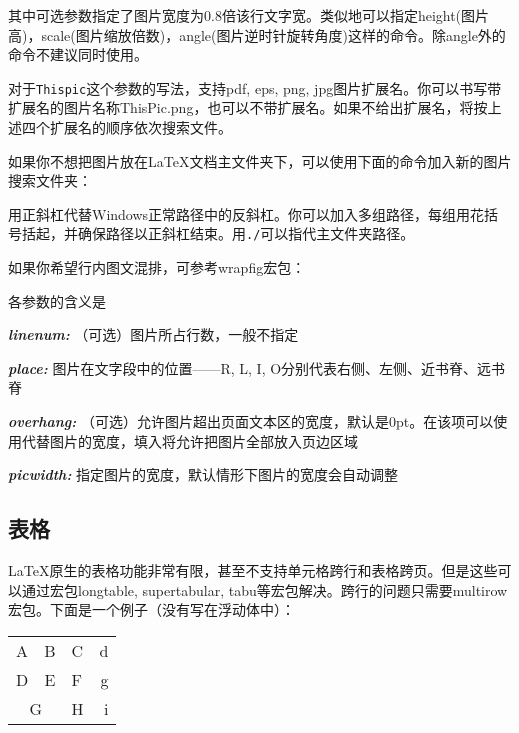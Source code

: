 {其中可选参数指定了图片宽度为0.8倍该行文字宽。类似地可以指定height(图片高)，scale(图片缩放倍数)，angle(图片逆时针旋转角度)这样的命令。除angle外的命令不建议同时使用。

对于\texttt{Thispic}这个参数的写法，\xelatex 支持pdf, eps, png, jpg图片扩展名。你可以书写带扩展名的图片名称ThisPic.png，也可以不带扩展名。如果不给出扩展名，将按上述四个扩展名的顺序依次搜索文件。\dpar

如果你不想把图片放在\LaTeX 文档主文件夹下，可以使用下面的命令加入新的图片搜索文件夹：
\begin{latex}{}
\graphicspath{c:/pics/}{./pic/}
\end{latex}

用正斜杠代替Windows正常路径中的反斜杠。你可以加入多组路径，每组用花括号括起，并确保路径以正斜杠结束。用\verb|./|可以指代主文件夹路径。\dpar

如果你希望行内图文混排，可参考wrapfig宏包：
\begin{latex}{}
\end{latex}

各参数的含义是
\begin{inlinee}
\item {\bfseries\itshape linenum:} （可选）图片所占行数，一般不指定
\item {\bfseries\itshape place:} 图片在文字段中的位置——R, L, I, O分别代表右侧、左侧、近书脊、远书脊
\item {\bfseries\itshape overhang:} （可选）允许图片超出页面文本区的宽度，默认是0pt。在该项可以使用\latexline{\\width}代替图片的宽度，填入\latexline{\\width}将允许把图片全部放入页边区域
\item {\bfseries\itshape picwidth:} 指定图片的宽度，默认情形下图片的宽度会自动调整
\end{inlinee}

\subsection{表格}
\LaTeX 原生的表格功能非常有限，甚至不支持单元格跨行和表格跨页。但是这些可以通过宏包longtable, supertabular, tabu等宏包解决。跨行的问题只需要multirow宏包。下面是一个例子（没有写在浮动体中）：

\begin{codeshow}
\begin{center}
  \begin{tabular}[c]{|l|c||p{3em}
    r@{-}} \hline\hline
    A & B & C & d\\D & E & F & g\\
    \cline{1-2}
    \multicolumn{2}{|c|}{G}&H&i\\
    \hline
  \end{tabular}
\end{center}
\end{codeshow}

}
